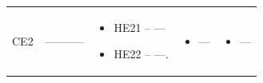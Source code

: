 \begin{landscape}
\begin{longtable}{m{1.2cm} m{5cm} m{8.2cm} m{5.2cm} m{5.2cm}}
		\hline
		
		
		
		\multirow{1}{*}{CE2} &
		\multirow{1}{5cm}{-----------} &
		
		\begin{itemize}
			\item HE21 –  ---
			\item HE22 – ---.
		\end{itemize}
		
		&
		\multirow{1}{5.2cm}{\begin{itemize}
				\item --- 
		\end{itemize}} &
		
		\multirow{1}{5.2cm}{\begin{itemize}
				\item --- 
		\end{itemize}} \\
		
	
	\end{longtable}
	
\end{landscape}


